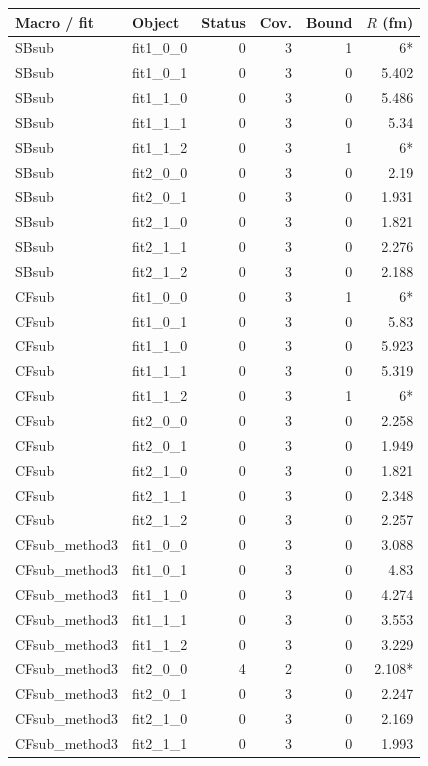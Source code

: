 \documentclass[11pt,a4paper]{article}
\begin{document}
{\scriptsize\begin{longtable}{llrrrr}\hline Macro / fit & Object & Status & Cov. & Bound & $R$ (fm)\\\hline\endhead
SBsub & fit1\_0\_0 & 0 & 3 & 1 & 6*\\
SBsub & fit1\_0\_1 & 0 & 3 & 0 & 5.402\\
SBsub & fit1\_1\_0 & 0 & 3 & 0 & 5.486\\
SBsub & fit1\_1\_1 & 0 & 3 & 0 & 5.34\\
SBsub & fit1\_1\_2 & 0 & 3 & 1 & 6*\\
SBsub & fit2\_0\_0 & 0 & 3 & 0 & 2.19\\
SBsub & fit2\_0\_1 & 0 & 3 & 0 & 1.931\\
SBsub & fit2\_1\_0 & 0 & 3 & 0 & 1.821\\
SBsub & fit2\_1\_1 & 0 & 3 & 0 & 2.276\\
SBsub & fit2\_1\_2 & 0 & 3 & 0 & 2.188\\
CFsub & fit1\_0\_0 & 0 & 3 & 1 & 6*\\
CFsub & fit1\_0\_1 & 0 & 3 & 0 & 5.83\\
CFsub & fit1\_1\_0 & 0 & 3 & 0 & 5.923\\
CFsub & fit1\_1\_1 & 0 & 3 & 0 & 5.319\\
CFsub & fit1\_1\_2 & 0 & 3 & 1 & 6*\\
CFsub & fit2\_0\_0 & 0 & 3 & 0 & 2.258\\
CFsub & fit2\_0\_1 & 0 & 3 & 0 & 1.949\\
CFsub & fit2\_1\_0 & 0 & 3 & 0 & 1.821\\
CFsub & fit2\_1\_1 & 0 & 3 & 0 & 2.348\\
CFsub & fit2\_1\_2 & 0 & 3 & 0 & 2.257\\
CFsub\_method3 & fit1\_0\_0 & 0 & 3 & 0 & 3.088\\
CFsub\_method3 & fit1\_0\_1 & 0 & 3 & 0 & 4.83\\
CFsub\_method3 & fit1\_1\_0 & 0 & 3 & 0 & 4.274\\
CFsub\_method3 & fit1\_1\_1 & 0 & 3 & 0 & 3.553\\
CFsub\_method3 & fit1\_1\_2 & 0 & 3 & 0 & 3.229\\
CFsub\_method3 & fit2\_0\_0 & 4 & 2 & 0 & 2.108*\\
CFsub\_method3 & fit2\_0\_1 & 0 & 3 & 0 & 2.247\\
CFsub\_method3 & fit2\_1\_0 & 0 & 3 & 0 & 2.169\\
CFsub\_method3 & fit2\_1\_1 & 0 & 3 & 0 & 1.993\\

\end{longtable}}
\end{document}
